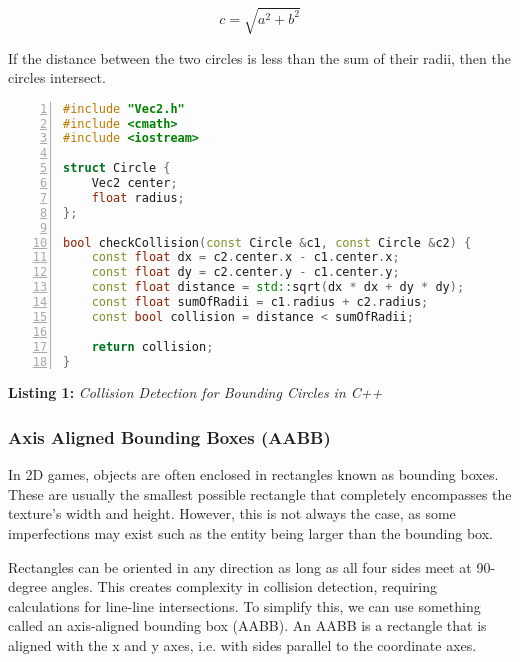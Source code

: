 \documentclass{article}
\begin{document}
\begin{equation}
    c = \sqrt{a^2 + b^2}
\end{equation}

If the distance between the two circles is less than the sum of their radii,
then the circles intersect.

\begin{mdframed}[linecolor=black!30!white,linewidth=.5pt,extratopheight=3em]
    \begin{lstlisting}[language=C++, aboveskip=3mm,
        belowskip=3mm,
        showstringspaces=false,
        columns=flexible,
        basicstyle={\small\ttfamily},
        numbers=left,
        numberstyle=\tiny\color{gray},
        keywordstyle=\color{blue},
        commentstyle=\color{dkgreen},
        stringstyle=\color{mauve},
        breaklines=true,
        breakatwhitespace=true,
        tabsize=3,
        xleftmargin=1em]
#include "Vec2.h"
#include <cmath>
#include <iostream>

struct Circle {
    Vec2 center;
    float radius;
};

bool checkCollision(const Circle &c1, const Circle &c2) {
    const float dx = c2.center.x - c1.center.x;
    const float dy = c2.center.y - c1.center.y;
    const float distance = std::sqrt(dx * dx + dy * dy);
    const float sumOfRadii = c1.radius + c2.radius;
    const bool collision = distance < sumOfRadii;

    return collision;
}
\end{lstlisting}

\end{mdframed}

\begin{center}
    \textbf{Listing 1:} \textit{Collision Detection for Bounding Circles in C++}
\end{center}

\newpage

\subsubsection{Axis Aligned Bounding Boxes (AABB)}
In 2D games, objects are often enclosed in rectangles known as bounding boxes.
These are usually the smallest possible rectangle that completely encompasses
the texture's width and height. However, this is not always the case, as some
imperfections may exist such as the entity being larger than the bounding box.

Rectangles can be oriented in any direction as long as all four sides meet at
90-degree angles. This creates complexity in collision detection, requiring
calculations for line-line intersections. To simplify this, we can use
something called an axis-aligned bounding box (AABB). An AABB is a rectangle
that is aligned with the x and y axes, i.e. with sides parallel to the
coordinate axes.
\end{document}
